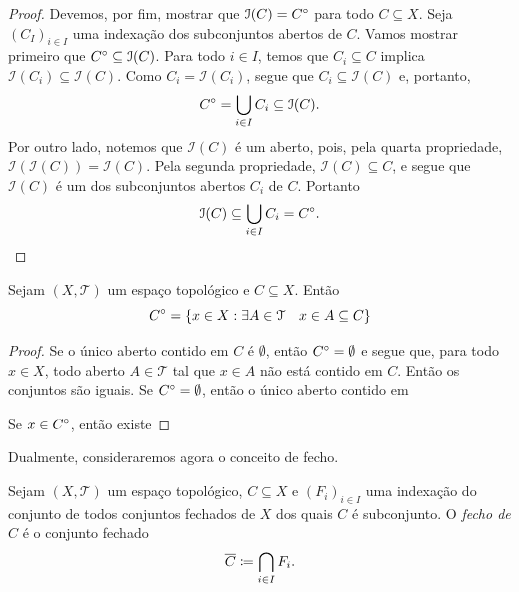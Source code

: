 \begin{proof}
Devemos, por fim, mostrar que $\mathcal I(C)={C}^\circ$ para todo $C \subseteq X$. Seja $(C_I)_{i \in I}$ uma indexação dos subconjuntos abertos de $C$. Vamos mostrar primeiro que ${C}^\circ \subseteq \mathcal I(C)$. Para todo $i \in I$, temos que $C_i \subseteq C$ implica $\mathcal I(C_i) \subseteq \mathcal I(C)$. Como $C_i = \mathcal I(C_i)$, segue que $C_i \subseteq \mathcal I(C)$ e, portanto,
	\begin{equation*}
	{C}^\circ = \bigcup_{i \in I} C_i \subseteq \mathcal I(C).
	\end{equation*}
	Por outro lado, notemos que $\mathcal I(C)$ é um aberto, pois, pela quarta propriedade, $\mathcal I(\mathcal I(C))= \mathcal I(C)$. Pela segunda propriedade, $\mathcal I(C) \subseteq C$, e segue que $\mathcal I(C)$ é um dos subconjuntos abertos $C_i$ de $C$. Portanto	
	\begin{equation*}
	\mathcal I(C) \subseteq \bigcup_{i \in I} C_i = {C}^\circ.
	\end{equation*}
\end{proof}

\begin{prop}
	Sejam $(X, \mathcal T)$ um espaço topológico e $C \subseteq X$. Então
	\begin{equation*}
	{C}^\circ = \{x \in X : \exists A \in \mathcal T \quad x \in A \subseteq C\}
	\end{equation*}
\end{prop}
\begin{proof}
	Se o único aberto contido em $C$ é $\emptyset$, então ${C}^\circ=\emptyset$ e segue que, para todo $x \in X$, todo aberto $A \in \mathcal T$ tal que $x \in A$ não está contido em $C$. Então os conjuntos são iguais.
	Se ${C}^\circ=\emptyset$, então o único aberto contido em 
	
	
	Se $x \in {C}^\circ$, então existe
\end{proof}









	Dualmente, consideraremos agora o conceito de fecho.

\begin{defi}
	Sejam $(X,\mathcal T)$ um espaço topológico, $C \subseteq X$ e $(F_i)_{i \in I}$ uma indexação do conjunto de todos conjuntos fechados de $X$ dos quais $C$ é subconjunto. O \emph{fecho de $C$} é o conjunto fechado
	\begin{equation*}
	\fec{C} \coloneqq \bigcap_{i \in I} F_i.
	\end{equation*}
\end{defi}

